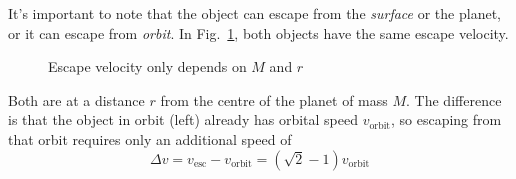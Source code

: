 

It's important to note that the object can escape from the \emph{surface} or
the planet, or it can escape from \emph{orbit}. In Fig.~\ref{fig:two-escapes},
both objects have the same escape velocity.
\begin{figure}[ht]
  \centering
  \begin{subfigure}{.4\linewidth}
    \centering
  \end{subfigure}
  \begin{subfigure}{.4\linewidth}
    \centering
  \end{subfigure}
  \caption{Escape velocity only depends on $M$ and $r$}
  \label{fig:two-escapes}
\end{figure}
Both are at a distance $r$ from the centre of the planet of mass $M$.
The difference is that the object in orbit (left) already has orbital speed
$v_\text{orbit}$, so escaping from that orbit requires only an additional
speed of
\begin{equation}
  \Delta v=v_\text{esc}-v_\text{orbit}=(\sqrt2-1)v_\text{orbit}
\end{equation}



